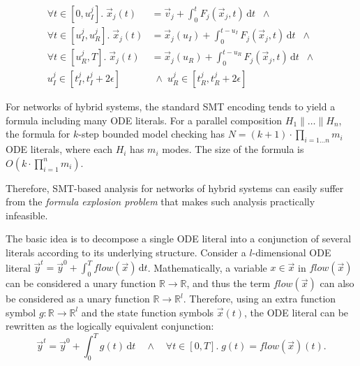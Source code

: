 \begin{align*}
\forall t \in [0,u_I^j].\;
\vec{x}_j(t) &= \vec{v}_j + \textstyle\int_0^{t}  F_j(\vec{x}_j,t)\,\mathrm{d}t
\;\;\wedge
\\
\forall t \in [u_I^j,u_R^j].\;
\vec{x}_j(t) &= \vec{x}_j(u_I) + \textstyle\int_0^{t-u_I}  F_j(\vec{x}_j,t)\,\mathrm{d}t
\;\;\wedge
\\
\forall t \in [u_R^j, T].\;
\vec{x}_j(t) &= \vec{x}_j(u_R) + \textstyle\int_0^{t-u_R}  F_j(\vec{x}_j,t)\,\mathrm{d}t
\;\;\wedge
\\
u_I^j \in [t_I^j,t_I^j + 2\epsilon]
&\;\wedge\;
u_R^j \in [t_R^j,t_R^j + 2\epsilon]
\end{align*}




For networks of hybrid systems,
the standard SMT encoding tends to yield a formula 
including many ODE literals. 
For %
a parallel composition
 $H_1 \parallel \ldots \parallel H_n$, %
the formula for $k$-step bounded model checking  
has $N = (k+1) \cdot \prod_{i = 1\ldots n} m_i$ ODE literals,
where each $H_i$ has $m_i$ modes.
The size of the formula is 
$O(k \cdot \prod_{i = 1}^n m_i)$.


%
Therefore, SMT-based analysis for networks of hybrid systems
can easily suffer from the \emph{formula explosion problem}
that makes such %
 analysis practically infeasible.




The basic idea is to decompose a single ODE literal
into a conjunction of several literals according to its underlying structure.
%
Consider a $l$-dimensional ODE literal
$\vec{y}^t = \vec{y}^0 + \textstyle\int_{0}^T \mathit{flow}(\vec{x}) \,\mathrm{d}t$.
Mathematically,
a variable $x \in \vec{x}$ in $\mathit{flow}(\vec{x})$ 
can be considered a unary function $\mathbb{R} \to \mathbb{R}$,
%
and thus
the term $\mathit{flow}(\vec{x})$ can also be considered as a unary function
$\mathbb{R} \to \mathbb{R}^l$.
%
Therefore, 
using an extra function symbol $g : \mathbb{R} \to \mathbb{R}^l$
and the state function symbols $\vec{x}(t)$,
the ODE literal can be rewritten as the logically equivalent conjunction: 
\[
\vec{y}^t = \vec{y}^0 + \textstyle\int_{0}^T g(t)  \,\mathrm{d}t
\quad\wedge\quad
\forall t \in [0,T].\; g(t) = \mathit{flow}(\vec{x})(t).
\]
%


